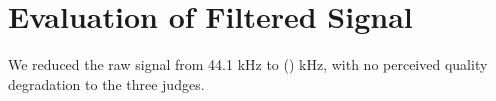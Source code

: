 \section{Evaluation of Filtered Signal}
We reduced the raw signal from 44.1 kHz to () kHz, 
with no perceived quality degradation to the three judges.
